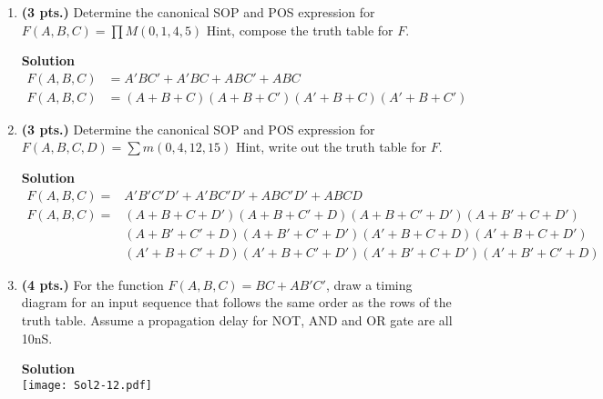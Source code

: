 \begin{enumerate}
                    \item \textbf{ (3 pts.)} Determine the canonical SOP and POS expression for
                        $F(A,B,C) = \prod M (0,1,4,5)$  Hint, compose the truth table for $F$.

                        \begin{onlysolution}  \textbf{Solution}
                            \begin{align*}
                                F(A,B,C)&=A'BC' + A'BC +ABC' +ABC  \\
                                F(A,B,C)&=(A+B+C)(A+B+C')(A'+B+C)(A'+B+C')
                            \end{align*}
                        \end{onlysolution}

                    \item \textbf{ (3 pts.)} Determine the canonical SOP and POS expression for
                        $F(A,B,C,D) = \sum m(0,4,12,15)$ Hint, write out the truth table for $F$.

                        \begin{onlysolution}  \textbf{Solution}
                            \begin{align*}
                                F(A,B,C)=&A'B'C'D' + A'BC'D' + ABC'D' + ABCD  \\
                                F(A,B,C)=&(A+B+C+D')(A+B+C'+D)(A+B+C'+D') (A+B'+C+D') \\
                                &(A+B'+C'+D)(A+B'+C'+D')(A'+B+C+D)(A'+B+C+D')\\
                                &(A'+B+C'+D)(A'+B+C'+D')(A'+B'+C+D')(A'+B'+C'+D)
                            \end{align*}
                        \end{onlysolution}

                        \filbreak
                    \item \textbf{ (4 pts.)} For the function $F(A,B,C)= BC+AB'C'$,  draw
                        a timing diagram for an input sequence that follows the same order
                        as the rows of the truth table.  Assume a propagation delay for NOT,
                        AND and OR gate are all 10nS.
                        \begin{onlysolution}  \textbf{Solution} \\
                            \texttt{[image: Sol2-12.pdf]}
                        \end{onlysolution}


\end{enumerate}
